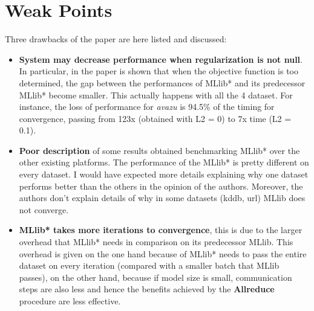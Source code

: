 \documentclass[10pt]{proc}
\begin{document}
\section{Weak Points}
Three drawbacks of the paper are here listed and discussed:
\begin{itemize}
    \item \textbf{System may decrease performance when  regularization is not null}. In particular, in the paper is shown that when the objective function is too determined, the gap between the performances of MLlib* and its predecessor MLlib* become smaller. This actually happens with all the 4 dataset. For instance, the loss of performance for \textit{avazu} is 94.5\% of the timing for convergence, passing from 123x (obtained with L2 = 0) to 7x time (L2 = 0.1).
    \item \textbf{Poor description} of some results obtained benchmarking MLlib* over the other existing platforms. The performance of the MLlib* is pretty different on every dataset. I would have expected more details explaining why one dataset performs better than the others in the opinion of the authors. Moreover, the authors don't explain details of why in some datasets (kddb, url) MLlib does not converge.
    \item \textbf{MLlib* takes more iterations to convergence}, this is due to the larger overhead that MLlib* needs in comparison on its predecessor MLlib. This overhead is given on the one hand because of MLlib* needs to pass the entire dataset on every iteration (compared with a smaller batch that MLlib passes), on the other hand, because if model size is small,  communication steps are also less and hence the benefits achieved by the \textbf{Allreduce} procedure are less effective.
\end{itemize}
\end{document}
